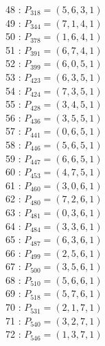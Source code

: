\documentclass{article}
\begin{document}
{\begin{multicols}{3}
48 : $P_{318}=( 5, 6, 3, 1 )$\\
49 : $P_{344}=( 7, 1, 4, 1 )$\\
50 : $P_{378}=( 1, 6, 4, 1 )$\\
51 : $P_{391}=( 6, 7, 4, 1 )$\\
52 : $P_{399}=( 6, 0, 5, 1 )$\\
53 : $P_{423}=( 6, 3, 5, 1 )$\\
54 : $P_{424}=( 7, 3, 5, 1 )$\\
55 : $P_{428}=( 3, 4, 5, 1 )$\\
56 : $P_{436}=( 3, 5, 5, 1 )$\\
57 : $P_{441}=( 0, 6, 5, 1 )$\\
58 : $P_{446}=( 5, 6, 5, 1 )$\\
59 : $P_{447}=( 6, 6, 5, 1 )$\\
60 : $P_{453}=( 4, 7, 5, 1 )$\\
61 : $P_{460}=( 3, 0, 6, 1 )$\\
62 : $P_{480}=( 7, 2, 6, 1 )$\\
63 : $P_{481}=( 0, 3, 6, 1 )$\\
64 : $P_{484}=( 3, 3, 6, 1 )$\\
65 : $P_{487}=( 6, 3, 6, 1 )$\\
66 : $P_{499}=( 2, 5, 6, 1 )$\\
67 : $P_{500}=( 3, 5, 6, 1 )$\\
68 : $P_{510}=( 5, 6, 6, 1 )$\\
69 : $P_{518}=( 5, 7, 6, 1 )$\\
70 : $P_{531}=( 2, 1, 7, 1 )$\\
71 : $P_{540}=( 3, 2, 7, 1 )$\\
72 : $P_{546}=( 1, 3, 7, 1 )$\\
\end{multicols}


%


%


}%
\end{document}
